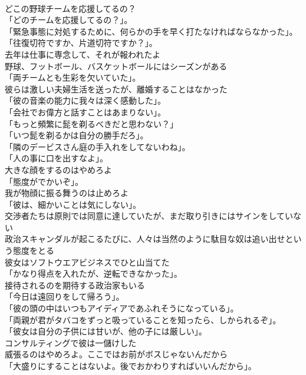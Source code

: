 \documentclass[8pt]{extreport}
\begin{document}
\begin{CJK}{UTF8}{min}
\\	どこの野球チームを応援してるの？	
\\	「どのチームを応援してるの？」。	
\\	「緊急事態に対処するために、何らかの手を早く打たなければならなかった」。	
\\	「往復切符ですか、片道切符ですか？」。	
\\	去年は仕事に専念して、それが報われたよ	
\\	野球、フットボール、バスケットボールにはシーズンがある	
\\	「両チームとも生彩を欠いていた」。	
\\	彼らは激しい夫婦生活を送ったが、離婚することはなかった	
\\	「彼の音楽の能力に我々は深く感動した」。	
\\	「会社でお偉方と話すことはあまりない」。	
\\	「もっと頻繁に髭を剃るべきだと思わない？」 
\\	「いつ髭を剃るかは自分の勝手だろ」。 
\\	「隣のデービスさん庭の手入れをしてないわね」。 
\\	「人の事に口を出すなよ」。	
\\	大きな顔をするのはやめろよ	
\\	「態度がでかいぞ」。	
\\	我が物顔に振る舞うのは止めろよ	
\\	「彼は、細かいことは気にしない」。	
\\	交渉者たちは原則では同意に達していたが、まだ取り引きにはサインをしていない	
\\	政治スキャンダルが起こるたびに、人々は当然のように駄目な奴は追い出せという態度をとる	
\\	彼女はソフトウエアビジネスでひと山当てた	
\\	「かなり得点を入れたが、逆転できなかった」。	
\\	接待されるのを期待する政治家もいる	
\\	「今日は遠回りをして帰ろう」。	
\\	「彼の頭の中はいつもアイディアであふれそうになっている」。	
\\	「両親が君がタバコをずっと吸っていることを知ったら、しかられるぞ」。	
\\	「彼女は自分の子供には甘いが、他の子には厳しい」。	
\\	コンサルティングで彼は一儲けした	
\\	威張るのはやめろよ。ここではお前がボスじゃないんだから	
\\	「大盛りにすることはないよ。後でおかわりすればいいんだから」。	

\end{CJK}
\end{document}
